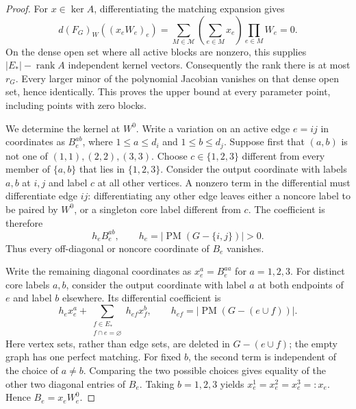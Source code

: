 \documentclass[11pt]{article}
\theoremstyle{remark}\newtheorem{remark}[theorem]{Remark}
\DeclareMathOperator{\rank}{rank}
\newcommand{\PM}{\operatorname{PM}}
\begin{document}
\begin{proof}
For $x\in\ker A$, differentiating the matching expansion gives
\[
 d(F_G)_W((x_eW_e)_e)
 =\sum_{M\in\mathcal M}\left(\sum_{e\in M}x_e\right)
     \prod_{e\in M}W_e=0.
\]
On the dense open set where all active blocks are nonzero, this
supplies $|E_*|-\rank A$ independent kernel vectors. Consequently
the rank there is at most $r_G$. Every larger minor of the polynomial
Jacobian vanishes on that dense open set, hence identically. This proves
the upper bound at every parameter point, including points with zero
blocks.

We determine the kernel at $W^0$. Write a variation on an active edge
$e=ij$ in coordinates as $B_e^{ab}$, where $1\leq a\leq d_i$ and
$1\leq b\leq d_j$. Suppose first that $(a,b)$ is not one of
$(1,1),(2,2),(3,3)$. Choose $c\in\{1,2,3\}$ different from every
member of $\{a,b\}$ that lies in $\{1,2,3\}$. Consider the output
coordinate with labels $a,b$ at $i,j$ and label $c$ at all other
vertices. A nonzero term in the differential must differentiate edge
$ij$: differentiating any other edge leaves either a noncore label
to be paired by $W^0$, or a singleton core label different from $c$.
The coefficient is therefore
\[
 h_e B_e^{ab},\qquad h_e=|\PM(G-\{i,j\})|>0.
\]
Thus every off-diagonal or noncore coordinate of $B_e$ vanishes.

Write the remaining diagonal coordinates as $x_e^a=B_e^{aa}$ for
$a=1,2,3$. For distinct core labels $a,b$, consider the output
coordinate with label $a$ at both endpoints of $e$ and label $b$
elsewhere. Its differential coefficient is
\[
 h_e x_e^a+
 \sum_{\substack{f\in E_*\\f\cap e=\varnothing}}
 h_{ef}x_f^b,
 \qquad h_{ef}=|\PM(G-(e\cup f))|.
\]
Here vertex sets, rather than edge sets, are deleted in $G-(e\cup f)$;
the empty graph has one perfect matching. For fixed $b$, the second
term is independent of the choice of $a\ne b$. Comparing the two
possible choices gives equality of the other two diagonal entries of
$B_e$. Taking $b=1,2,3$ yields
$x_e^1=x_e^2=x_e^3=:x_e$. Hence $B_e=x_eW_e^0$.


\end{proof}
\end{document}
